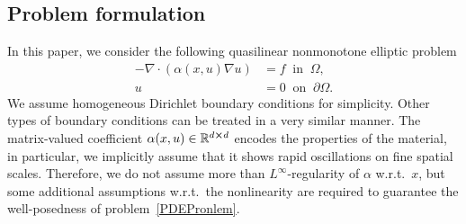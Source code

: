 \documentclass{article}
\begin{document}
\subsection{Problem formulation}

In this paper, we consider the following quasilinear nonmonotone elliptic problem 
\begin{equation}\label{PDEPronlem}
       \begin{split}
           -\nabla\cdot{(\alpha(x,u)\nabla{u})}&=f \;\;\text{in}\;\;\Omega,  \\ u&=0 \;\; \text{on} \;\; \partial \Omega.
        \end{split}
\end{equation}
We assume homogeneous Dirichlet boundary conditions for simplicity. Other types of boundary conditions can be treated in a very similar manner. The matrix-valued coefficient $\alpha(x,u) \in \mathbb{R}^{d\cross d}$ encodes the properties of the material, in particular, we implicitly assume that it shows rapid oscillations on fine spatial scales. Therefore, we do not assume more than $L^\infty$-regularity of $\alpha$ w.r.t.~$x$, but some additional assumptions w.r.t.~the nonlinearity are required to guarantee the well-posedness of problem~\eqref{PDEPronlem}. 
\end{document}
